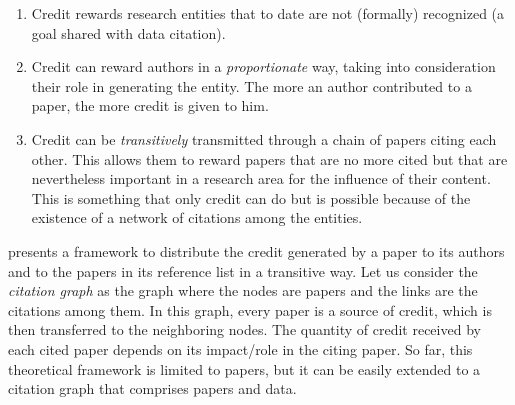 \begin{enumerate}
\item Credit rewards research entities that to date are not (formally) recognized (a goal shared with data citation).
\item Credit can reward authors in a \emph{proportionate} way, taking into consideration their role in generating the entity. The more an author contributed to a paper, the more credit is given to him.
\item Credit can be \emph{transitively} transmitted through a chain of papers citing each other. This allows them to reward papers that are no more cited but that are nevertheless important in a research area for the influence of their content.
This is something that only credit can do but is possible because of the existence of a network of citations among the entities.
\end{enumerate}


\citep{creditFang18} presents a framework to distribute the credit generated by a paper to its authors and to the papers in its reference list in a transitive way. 
Let us consider the \emph{citation graph} as the graph where the nodes are papers and the links are the citations among them.
In this graph, every paper is a source of credit, which is then transferred to the neighboring nodes.
The quantity of credit received by each cited paper depends on its impact/role in the citing paper. 
So far, this theoretical framework is limited to papers, but it can be easily extended to a citation graph that comprises papers and data. 

